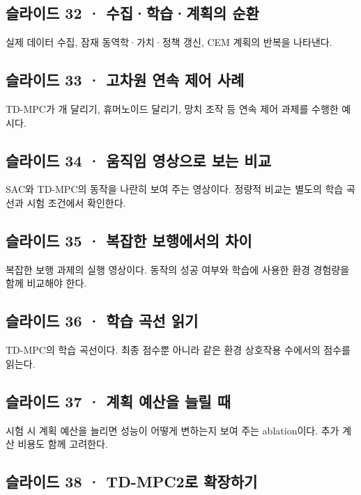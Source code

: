 \documentclass[11pt,a4paper]{article}
\begin{document}
\subsection{슬라이드 32 · 수집·학습·계획의 순환}

실제 데이터 수집, 잠재 동역학·가치·정책 갱신, CEM 계획의 반복을 나타낸다.\par

\subsection{슬라이드 33 · 고차원 연속 제어 사례}

TD-MPC가 개 달리기, 휴머노이드 달리기, 망치 조작 등 연속 제어 과제를 수행한 예시다.\par

\subsection{슬라이드 34 · 움직임 영상으로 보는 비교}

SAC와 TD-MPC의 동작을 나란히 보여 주는 영상이다. 정량적 비교는 별도의 학습 곡선과 시험 조건에서 확인한다.\par

\subsection{슬라이드 35 · 복잡한 보행에서의 차이}

복잡한 보행 과제의 실행 영상이다. 동작의 성공 여부와 학습에 사용한 환경 경험량을 함께 비교해야 한다.\par

\subsection{슬라이드 36 · 학습 곡선 읽기}

TD-MPC의 학습 곡선이다. 최종 점수뿐 아니라 같은 환경 상호작용 수에서의 점수를 읽는다.\par

\subsection{슬라이드 37 · 계획 예산을 늘릴 때}

시험 시 계획 예산을 늘리면 성능이 어떻게 변하는지 보여 주는 ablation이다. 추가 계산 비용도 함께 고려한다.\par

\subsection{슬라이드 38 · TD-MPC2로 확장하기}
\end{document}
